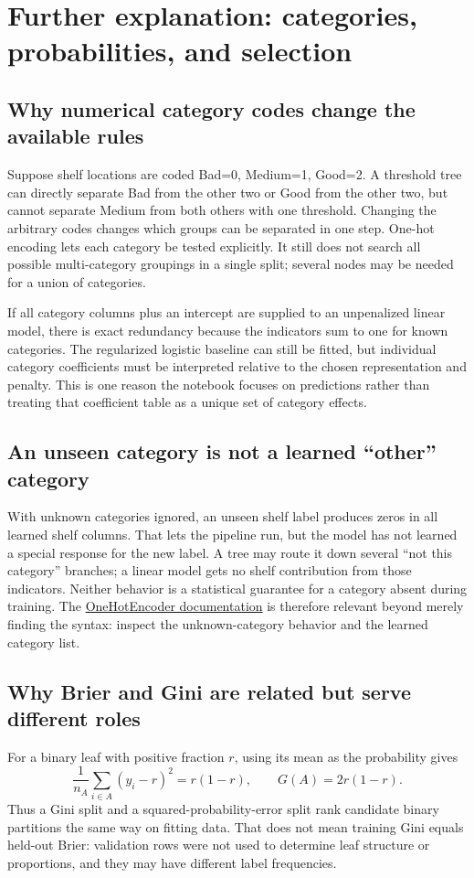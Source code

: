 \section*{Further explanation: categories, probabilities, and selection}
\subsection*{Why numerical category codes change the available rules}
Suppose shelf locations are coded Bad=0, Medium=1, Good=2. A threshold tree can directly separate Bad from the
other two or Good from the other two, but cannot separate Medium from both others with one threshold.
Changing the arbitrary codes changes which groups can be separated in one step. One-hot encoding lets each
category be tested explicitly. It still does not search all possible multi-category groupings in a single split;
several nodes may be needed for a union of categories.

If all category columns plus an intercept are supplied to an unpenalized linear model, there is exact redundancy
because the indicators sum to one for known categories. The regularized logistic baseline can still be fitted,
but individual category coefficients must be interpreted relative to the chosen representation and penalty.
This is one reason the notebook focuses on predictions rather than treating that coefficient table as a unique
set of category effects.

\subsection*{An unseen category is not a learned ``other'' category}
With unknown categories ignored, an unseen shelf label produces zeros in all learned shelf columns.
That lets the pipeline run, but the model has not learned a special response for the new label.
A tree may route it down several ``not this category'' branches; a linear model gets no shelf contribution
from those indicators. Neither behavior is a statistical guarantee for a category absent during training.
The \href{https://scikit-learn.org/1.8/modules/generated/sklearn.preprocessing.OneHotEncoder.html}{OneHotEncoder documentation}
is therefore relevant beyond merely finding the syntax: inspect the unknown-category behavior and the learned category list.

\subsection*{Why Brier and Gini are related but serve different roles}
For a binary leaf with positive fraction $r$, using its mean as the probability gives
\[\frac1{n_A}\sum_{i\in A}(y_i-r)^2=r(1-r),\qquad G(A)=2r(1-r).\]
Thus a Gini split and a squared-probability-error split rank candidate binary partitions the same way on fitting data.
That does not mean training Gini equals held-out Brier: validation rows were not used to determine leaf structure
or proportions, and they may have different label frequencies.


